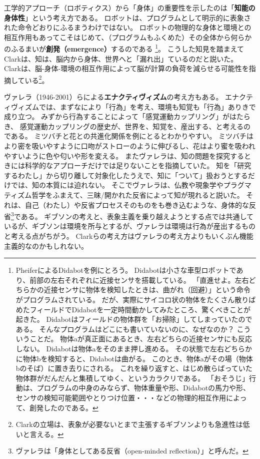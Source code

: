 工学的アプローチ（ロボティクス）から「身体」の重要性を示したのは「\textbf{知能の身体性}」という考え方である。
ロボットは、プログラムとして明示的に表象された命令どおりにふるまうわけではない。
ロボットの物理的な身体と環境との相互作用もあってこそはじめて、（プログラムもふくめた）その全体から何らかのふるまいが\textbf{創発（emergence）}するのである
\footnote{PheiferによるDidabot\cite{pheifer:2001}を例にとろう。
Didabotは小さな車型ロボットであり、前部の左右それぞれに近接センサを搭載している。
「直進せよ。左右どちらかの近接センサに物体を検知したときは、曲がれ（回避）」という命令がプログラムされている。
だが、実際にサイコロ状の物体をたくさん散りばめたフィールドでDidabotを一定時間動かしてみたところ、驚くべきことが起きた。
Didabotはフィールドの物体群を「お掃除」してしまっていたのである。
そんなプログラムはどこにも書いていないのに、なぜなのか？
こういうことだ。
物体aが真正面にあるとき、左右どちらの近接センサにも反応しない。
Didabotは物体aをそのまま押し進める。
その状態で左右どちらかに物体bを検知すると、Didabotは曲がる。
このとき、物体aがその場（物体bのそば）に置き去りにされる。
これを繰り返すと、はじめ散らばっていた物体群がだんだんと集積してゆく、というカラクリである。
「おそうじ」行動は、プログラムの中身のみならず、物体重量や形、Didabotの馬力や形、センサの検知可能範囲やとりつけ位置・・・などの物理的相互作用によって、創発したのである。
}。
こうした知見を踏まえてClark\cite{clark:1997}は、知は、脳内から身体、世界へと「漏れ出」ているのだと説いた。
Clarkは、脳-身体-環境の相互作用によって脳が計算の負荷を減らせる可能性を指摘している\footnote{
Clarkの立場は、表象が必要ないとまで主張するギブソンよりも急進性は低いと言える。
}。

ヴァレラ（1946-2001）らによる\textbf{エナクティヴィズム}の考え方\cite{varela_et_al:1991}もある。
エナクティヴィズムでは、まずなにより「行為」を考え、環境も知覚も「行為」ありきで成り立つ。
みずから行為することによって「感覚運動カップリング」がはたらき、
感覚運動カップリングの歴史が、世界を、知覚を、産出する、と考えるのである。
ミツバチと花との共進化関係を例にとるとわかりやすい。
ミツバチはより密を吸いやすように口吻がストローのように伸びるし、花はより蜜を吸われやすいように色や匂いや形を変える。
またヴァレラは、知の問題を探究するときには科学的なアプローチだけでは足りないことを指摘していた。
知を「研究するわたし」から切り離して対象化したうえで、知に「ついて」扱おうとするだけでは、知の本質には迫れない。
そこでヴァレラは、仏教や現象学やプラグマティズム哲学をふまえて、三昧/開かれた反省によって知が現れると説いた。
それは、自己（わたし）や反省プロセスそのものをも巻き込むような、身体的な反省\footnote{ヴァレラは「身体としてある反省（open-minded reflection）」と呼んだ。}である。
ギブソンの考えと、表象主義を乗り越えようとする点では共通しているが、ギブソンは環境を所与とするが、ヴァレラは環境は行為が産出するものと考える点がちがう。
Clarkらの考え方はヴァレラの考え方よりもいくぶん機能主義的なのかもしれない。

